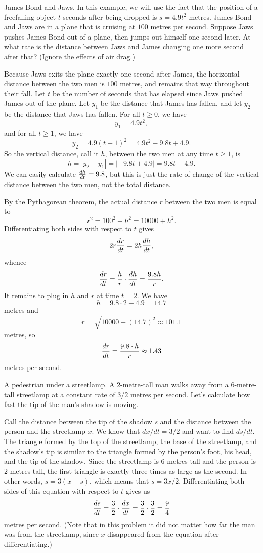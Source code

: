 \medskip\boldlabel James Bond and Jaws. In this example, we will use the fact that the position
of a freefalling object $t$ seconds after being dropped is $s = 4.9t^2$ metres.
James Bond and Jaws are in a plane that is cruising at $100$ metres per second. Suppose Jaws pushes James Bond
out of a plane, then jumps out himself one second later. At what rate is the distance between Jaws
and James changing one more second after that? (Ignore the effects of air drag.)

Because Jaws exits the plane exactly one second after James, the horizontal distance between the two men
is $100$ metres, and remains that way throughout their fall. Let $t$ be the number of seconds that
has elapsed since Jaws pushed James out of the plane. Let $y_1$ be the distance that James
has fallen, and let $y_2$ be the distance that Jaws has fallen. For all $t\ge 0$, we have
$$y_1 = 4.9t^2,$$
and for all $t\ge 1$, we have
$$y_2 = 4.9(t-1)^2 = 4.9t^2 - 9.8t + 4.9.$$
So the vertical distance, call it $h$, between the two men at any time $t\ge 1$, is
$$h = |y_2 - y_1| = |{-9.8 t} + 4.9| = 9.8t-4.9.$$
We can easily calculate ${dh\over dt} = 9.8$,
but this is just the rate of change of the vertical distance between the two men, not the total distance.

By the Pythagorean theorem, the actual distance $r$ between the two men is equal to
$$r^2 = 100^2 + h^2 = 10000 + h^2.$$
Differentiating both sides with respect to $t$ gives
$$2r{dr\over dt} = 2h{dh\over dt},$$
whence
$${dr\over dt} = {h\over r}\cdot {dh\over dt} = {9.8h\over r}.$$
It remains to plug in $h$ and $r$ at time $t=2$. We have
$$h= 9.8\cdot 2 - 4.9 = 14.7$$
metres and
$$r = \sqrt{10000 + (14.7)^2} \approx 101.1$$
metres,
so
$${dr\over dt} = {9.8 \cdot h\over r} \approx 1.43$$
metres per second.

\medskip\boldlabel {} A pedestrian under a streetlamp. A $2$-metre-tall man walks away from
a $6$-metre-tall streetlamp at a constant rate of $3/2$ metres per second. Let's calculate
how fast the tip of the man's shadow is moving.

Call the distance between the tip of the shadow $s$ and the distance between the person and the streetlamp
$x$. We know that $dx/dt = 3/2$ and want to find $ds/dt$.
The triangle formed by the top of the streetlamp, the base of the streetlamp, and the shadow's tip
is similar to the triangle formed by the person's foot, his head, and the tip of the shadow.
Since the streetlamp is $6$ metres tall and the person is $2$ metres tall, the first triangle is exactly
three times as large as the second. In other words, $s = 3(x-s)$, which means that $s = 3x/2$.
Differentiating both sides of this equation with respect to $t$ gives us
$${ds\over dt} = {3\over 2}\cdot {dx\over dt} = {3\over 2}\cdot {3\over 2} = {9\over 4}$$
metres per second. (Note that in this problem it did not matter how far the man was from the streetlamp,
since $x$ disappeared from the equation after differentiating.)

